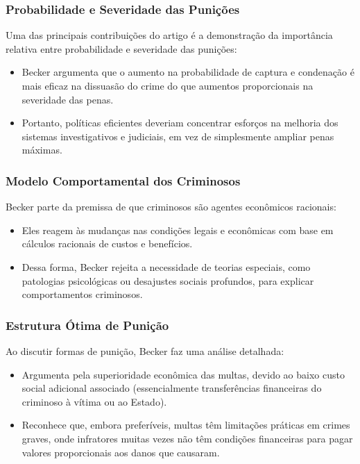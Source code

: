 \documentclass[a4paper,12pt]{article}[abntex2]
\begin{document}
\subsubsection{\textbf{Probabilidade e Severidade das Punições}}

Uma das principais contribuições do artigo é a demonstração da importância relativa entre probabilidade e severidade das punições:

\begin{itemize}
    \item Becker argumenta que o aumento na probabilidade de captura e condenação é mais eficaz na dissuasão do crime do que aumentos proporcionais na severidade das penas.
    \item Portanto, políticas eficientes deveriam concentrar esforços na melhoria dos sistemas investigativos e judiciais, em vez de simplesmente ampliar penas máximas.
\end{itemize}

\subsubsection{\textbf{Modelo Comportamental dos Criminosos}}

Becker parte da premissa de que criminosos são agentes econômicos racionais:

\begin{itemize}
    \item Eles reagem às mudanças nas condições legais e econômicas com base em cálculos racionais de custos e benefícios.
    \item Dessa forma, Becker rejeita a necessidade de teorias especiais, como patologias psicológicas ou desajustes sociais profundos, para explicar comportamentos criminosos.
\end{itemize}

\subsubsection{\textbf{Estrutura Ótima de Punição}}

Ao discutir formas de punição, Becker faz uma análise detalhada:

\begin{itemize}
    \item Argumenta pela superioridade econômica das multas, devido ao baixo custo social adicional associado (essencialmente transferências financeiras do criminoso à vítima ou ao Estado).
    \item Reconhece que, embora preferíveis, multas têm limitações práticas em crimes graves, onde infratores muitas vezes não têm condições financeiras para pagar valores proporcionais aos danos que causaram.
\end{itemize}
\end{document}
